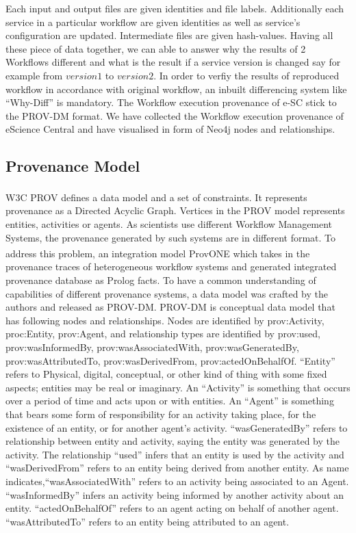 \documentclass[10pt,conference,twocolumn]{IEEEtran}
\begin{document}
Each input and output files are given identities and file labels. Additionally each service in a particular workflow are given identities as well as service's configuration are updated. Intermediate files are given hash-values. Having all these piece of data together, we can able to answer why the results of 2 Workflows different and what is the result if a service version is
changed say for example from $version1$ to $version2$.
In order to verfiy the results of reproduced workflow in accordance with original workflow, an inbuilt differencing system like \enquote{Why-Diff} is mandatory.  The Workflow execution provenance of e-SC stick to the PROV-DM format. We have collected the Workflow execution provenance of eScience Central and have visualised in form of Neo4j nodes and relationships.

\subsection{Provenance Model}
W3C PROV \textsuperscript{\cite{ProvDM}} defines a data model and a set of constraints. It represents provenance as a Directed Acyclic Graph. Vertices in the PROV model represents entities, activities or agents. As scientists use different Workflow Management Systems, the provenance generated by such systems are in different format. To address this problem, an integration model ProvONE \textsuperscript{\cite{oliveira2016}} which takes in the provenance traces of heterogeneous workflow systems and generated integrated provenance database as Prolog facts. To have a common understanding of capabilities of different provenance systems, a data model was crafted by the authors and released as PROV-DM. PROV-DM is conceptual data model that has following nodes and relationships. Nodes are identified by prov:Activity, proc:Entity, prov:Agent, and relationship types are identified by prov:used, prov:wasInformedBy, prov:wasAssociatedWith, prov:wasGeneratedBy, prov:wasAttributedTo, prov:wasDerivedFrom, prov:actedOnBehalfOf. \enquote{Entity} refers to Physical, digital, conceptual, or other kind of thing with some fixed aspects; entities may be real
or imaginary. An \enquote{Activity} is something that occurs over a period of time and acts upon or with entities. An \enquote{Agent} is something that bears some form of responsibility for an activity taking place, for the existence of an entity, or for another agent’s activity. \enquote{wasGeneratedBy} refers to relationship between entity and activity, saying the entity was generated by the
activity. The relationship \enquote{used} infers that an entity is used by the activity and \enquote{wasDerivedFrom} refers to an entity being derived from another entity. As name indicates,\enquote{wasAssociatedWith} refers to an activity being associated to an Agent. \enquote{wasInformedBy} infers an activity being informed by another activity about an entity. \enquote{actedOnBehalfOf} refers to an agent acting on behalf of another agent. \enquote{wasAttributedTo} refers to an entity being attributed to an agent. 
\end{document}
